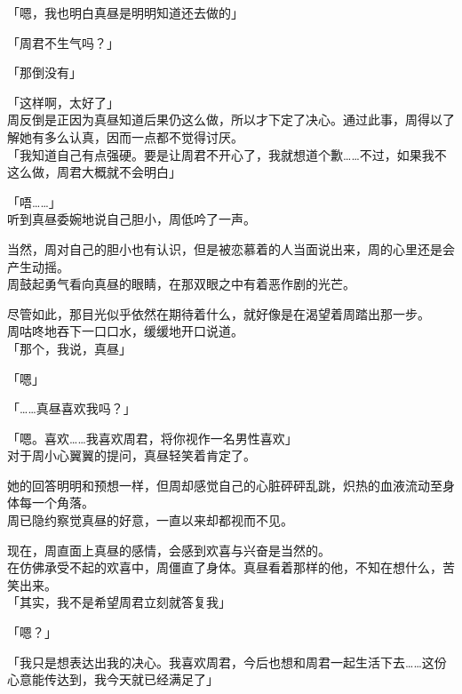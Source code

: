 「嗯，我也明白真昼是明明知道还去做的」

「周君不生气吗？」

「那倒没有」

「这样啊，太好了」\\

周反倒是正因为真昼知道后果仍这么做，所以才下定了决心。通过此事，周得以了解她有多么认真，因而一点都不觉得讨厌。\\

「我知道自己有点强硬。要是让周君不开心了，我就想道个歉……不过，如果我不这么做，周君大概就不会明白」

「唔……」\\

听到真昼委婉地说自己胆小，周低吟了一声。

当然，周对自己的胆小也有认识，但是被恋慕着的人当面说出来，周的心里还是会产生动摇。\\

周鼓起勇气看向真昼的眼睛，在那双眼之中有着恶作剧的光芒。

尽管如此，那目光似乎依然在期待着什么，就好像是在渴望着周踏出那一步。\\

周咕咚地吞下一口口水，缓缓地开口说道。\\

「那个，我说，真昼」

「嗯」

「……真昼喜欢我吗？」

「嗯。喜欢……我喜欢周君，将你视作一名男性喜欢」\\

对于周小心翼翼的提问，真昼轻笑着肯定了。

她的回答明明和预想一样，但周却感觉自己的心脏砰砰乱跳，炽热的血液流动至身体每一个角落。\\

周已隐约察觉真昼的好意，一直以来却都视而不见。

现在，周直面上真昼的感情，会感到欢喜与兴奋是当然的。\\

在仿佛承受不起的欢喜中，周僵直了身体。真昼看着那样的他，不知在想什么，苦笑出来。\\

「其实，我不是希望周君立刻就答复我」

「嗯？」

「我只是想表达出我的决心。我喜欢周君，今后也想和周君一起生活下去……这份心意能传达到，我今天就已经满足了」\\

